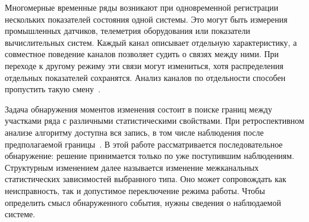 \documentclass[bachelor, och, diploma]{SCWorks}
\begin{document}

\date{2027}

\maketitle

\secNumbering

\tableofcontents




\intro

Многомерные временные ряды возникают при одновременной регистрации нескольких показателей состояния одной системы. Это могут быть измерения промышленных датчиков, телеметрия оборудования или показатели вычислительных систем. Каждый канал описывает отдельную характеристику, а совместное поведение каналов позволяет судить о связях между ними. При переходе к другому режиму эти связи могут измениться, хотя распределения отдельных показателей сохранятся. Анализ каналов по отдельности способен пропустить такую смену~\cite{wu2024changepoint}.

Задача обнаружения моментов изменения состоит в поиске границ между участками ряда с различными статистическими свойствами. При ретроспективном анализе алгоритму доступна вся запись, в том числе наблюдения после предполагаемой границы~\cite{truong2020review}. В этой работе рассматривается последовательное обнаружение: решение принимается только по уже поступившим наблюдениям. Структурным изменением далее называется изменение межканальных статистических зависимостей выбранного типа. Оно может сопровождать как неисправность, так и допустимое переключение режима работы. Чтобы определить смысл обнаруженного события, нужны сведения о наблюдаемой системе.
\end{document}
